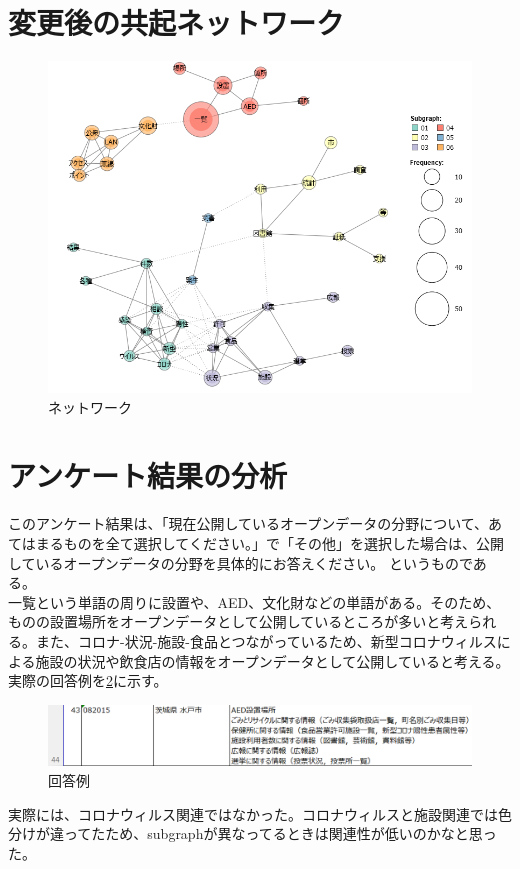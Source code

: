 \documentclass[a4paper,11pt]{ltjsarticle}
\begin{document}
\section{変更後の共起ネットワーク}
\begin{figure}[htbp]
    \centering
    \includegraphics[width = \columnwidth]{image/net2.png}
    \caption{ネットワーク}
    \label{fig:net2}
\end{figure}
\newpage
\section{アンケート結果の分析}
このアンケート結果は、「現在公開しているオープンデータの分野について、あてはまるものを全て選択してください。」で「その他」を選択した場合は、公開しているオープンデータの分野を具体的にお答えください。
というものである。\\
一覧という単語の周りに設置や、AED、文化財などの単語がある。そのため、
ものの設置場所をオープンデータとして公開しているところが多いと考えられる。また、コロナ-状況-施設-食品とつながっているため、新型コロナウィルスによる施設の状況や飲食店の情報をオープンデータとして公開していると考える。
実際の回答例を\ref{fig:ans}に示す。
\begin{figure}[htbp]
    \centering
    \includegraphics[width = \columnwidth]{image/example.png}
    \caption{回答例}
    \label{fig:ans}
\end{figure}
実際には、コロナウィルス関連ではなかった。コロナウィルスと施設関連では色分けが違ってたため、subgraphが異なってるときは関連性が低いのかなと思った。
\end{document}
